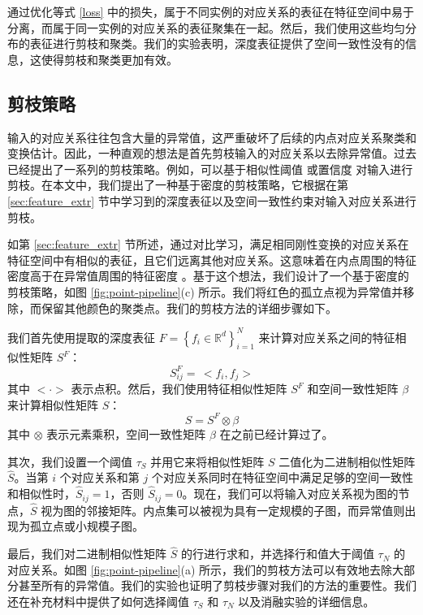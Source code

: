 通过优化等式 \ref{loss} 中的损失，属于不同实例的对应关系的表征在特征空间中易于分离，而属于同一实例的对应关系的表征聚集在一起。然后，我们使用这些均匀分布的表征进行剪枝和聚类。我们的实验表明，深度表征提供了空间一致性没有的信息，这使得剪枝和聚类更加有效。

\subsection{剪枝策略}\label{sec:pruning}
输入的对应关系往往包含大量的异常值，这严重破坏了后续的内点对应关系聚类和变换估计。因此，一种直观的想法是首先剪枝输入的对应关系以去除异常值。过去已经提出了一系列的剪枝策略。例如，可以基于相似性阈值 \cite{heckel2013subspace} 或置信度 \cite{zhao2021progressive} 对输入进行剪枝。在本文中，我们提出了一种基于密度的剪枝策略，它根据在第 \ref{sec:feature_extr} 节中学习到的深度表征以及空间一致性约束对输入对应关系进行剪枝。

如第 \ref{sec:feature_extr} 节所述，通过对比学习，满足相同刚性变换的对应关系在特征空间中有相似的表征，且它们远离其他对应关系。这意味着在内点周围的特征密度高于在异常值周围的特征密度 \cite{torr2002napsac}。基于这个想法，我们设计了一个基于密度的剪枝策略，如图 \ref{fig:point-pipeline}(c) 所示。我们将红色的孤立点视为异常值并移除，而保留其他颜色的聚类点。我们的剪枝方法的详细步骤如下。

我们首先使用提取的深度表征 $F=\left\{f_{i} \in \mathbb{R}^{d}\right\}_{i=1}^{N}$ 来计算对应关系之间的特征相似性矩阵 $S^F$：
\begin{equation}
  S_{i j}^{F}= \, <f_{i}, f_{j}>
\end{equation}
其中 $<\cdot>$ 表示点积。然后，我们使用特征相似性矩阵 $S^F$ 和空间一致性矩阵 $\beta$ 来计算相似性矩阵 $S$：
\begin{equation}
  S=S^{F} \otimes \beta
\end{equation}
其中 $\otimes$ 表示元素乘积，空间一致性矩阵 $\beta$ 在之前已经计算过了。

其次，我们设置一个阈值 $\tau_{S}$ 并用它来将相似性矩阵 $S$ 二值化为二进制相似性矩阵 $\hat{S}$。当第 $i$ 个对应关系和第 $j$ 个对应关系同时在特征空间中满足足够的空间一致性和相似性时，$\hat{S}_{ij}=1$，否则 $\hat{S}_{i j}=0$。现在，我们可以将输入对应关系视为图的节点，$\hat{S}$ 视为图的邻接矩阵。内点集可以被视为具有一定规模的子图，而异常值则出现为孤立点或小规模子图。

最后，我们对二进制相似性矩阵 $\hat{S}$ 的行进行求和，并选择行和值大于阈值 $\tau_N$ 的对应关系。如图 \ref{fig:point-pipeline}(a) 所示，我们的剪枝方法可以有效地去除大部分甚至所有的异常值。我们的实验也证明了剪枝步骤对我们的方法的重要性。我们还在补充材料中提供了如何选择阈值 $\tau_S$ 和 $\tau_N$ 以及消融实验的详细信息。

